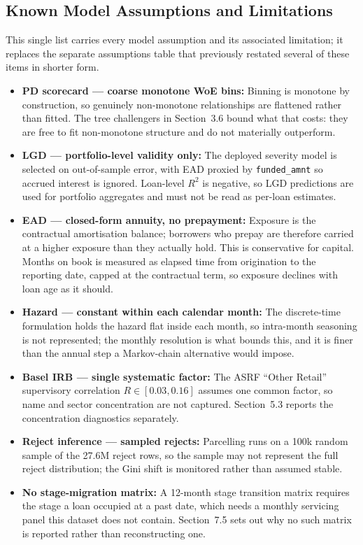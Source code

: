 \documentclass[11pt,a4paper]{article}
\begin{document}
\subsection{Known Model Assumptions and Limitations}
This single list carries every model assumption and its associated limitation; it replaces the separate assumptions table that previously restated several of these items in shorter form.
\begin{itemize}
    \item \textbf{PD scorecard --- coarse monotone WoE bins:} Binning is monotone by construction, so genuinely non-monotone relationships are flattened rather than fitted. The tree challengers in Section~3.6 bound what that costs: they are free to fit non-monotone structure and do not materially outperform.
    \item \textbf{LGD --- portfolio-level validity only:} The deployed severity model is selected on out-of-sample error, with EAD proxied by \texttt{funded\_amnt} so accrued interest is ignored. Loan-level $R^2$ is negative, so LGD predictions are used for portfolio aggregates and must not be read as per-loan estimates.
    \item \textbf{EAD --- closed-form annuity, no prepayment:} Exposure is the contractual amortisation balance; borrowers who prepay are therefore carried at a higher exposure than they actually hold. This is conservative for capital. Months on book is measured as elapsed time from origination to the reporting date, capped at the contractual term, so exposure declines with loan age as it should.
    \item \textbf{Hazard --- constant within each calendar month:} The discrete-time formulation holds the hazard flat inside each month, so intra-month seasoning is not represented; the monthly resolution is what bounds this, and it is finer than the annual step a Markov-chain alternative would impose.
    \item \textbf{Basel IRB --- single systematic factor:} The ASRF ``Other Retail'' supervisory correlation $R \in [0.03, 0.16]$ assumes one common factor, so name and sector concentration are not captured. Section~5.3 reports the concentration diagnostics separately.
    \item \textbf{Reject inference --- sampled rejects:} Parcelling runs on a 100k random sample of the 27.6M reject rows, so the sample may not represent the full reject distribution; the Gini shift is monitored rather than assumed stable.
    \item \textbf{No stage-migration matrix:} A 12-month stage transition matrix requires the stage a loan occupied at a past date, which needs a monthly servicing panel this dataset does not contain. Section~7.5 sets out why no such matrix is reported rather than reconstructing one.

\end{itemize}
\end{document}
